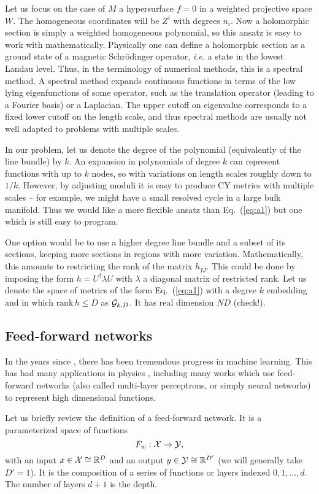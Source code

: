 \documentclass[12pt]{article}
\def\IR{\mathbb{R}}
\def\CX {{\cal X}}
\def\CG {{\cal G}}
\def\CY{{\cal Y}}
\newcommand{\eq}[1]{Eq.~(\ref{eq:#1})}
\newcommand{\be}{\begin{equation}}
\newcommand{\ee}{\end{equation}}
\def\bJ{{\bar{J}}}
\begin{document}
Let us focus on the case of $M$ a hypersurface $f=0$ in a weighted projective space $W$.
The homogeneous coordinates will be $Z^i$ with degrees $n_i$.
Now a holomorphic section is simply
a weighted homogeneous polynomial, so this ansatz is easy to work with mathematically.
Physically one can define a holomorphic section as a 
ground state of a magnetic Schr\"odinger operator, {\it i.e.} a state in the lowest Landau level.
Thus, in the terminology of numerical methods, this is a spectral method.  A spectral method expands
continuous functions in terms of the low lying eigenfunctions of some operator, such as the
translation operator (leading to a Fourier basis) or a Laplacian.  The upper cutoff on eigenvalue
corresponds to a fixed lower cutoff on the length scale, and thus 
spectral methods are usually not well adapted to problems with multiple scales.

In our problem, 
let us denote the degree of the polynomial (equivalently of the line bundle) by $k$.  An expansion
in polynomials of degree $k$ can represent functions with up to $k$ nodes, so with variations on
length scales roughly down to $1/k$.  However,
by adjusting moduli it is easy to produce CY metrics with multiple scales -- for example,
we might have a small resolved cycle in a large bulk manifold.  Thus we would like a more flexible
ansatz than \eq{a1} but one which is still easy to program.  

One option would be to use a higher
degree line bundle and a subset of its sections, keeping more sections in regions with more variation.
Mathematically, this amounts to restricting the rank of the matrix $h_{I\bJ}$.
This could be done by imposing the form $h=U^\dag \lambda U$ with $\lambda$ a
diagonal matrix of restricted rank.
Let us denote the space of metrics of the form \eq{a1} 
with a degree $k$ embedding and in which $\mbox{rank}\, h \le D$ as $\CG_{k,D}$.
It has real dimension $ND$ (check!).

\subsection{ Feed-forward networks }

In the years since \cite{metrics}, there has been tremendous progress in machine learning.
This has had many applications in physics \cite{review}, including many works which 
use feed-forward networks (also called multi-layer perceptrons, or simply neural networks)
 to represent high dimensional functions.  

Let us briefly review the definition of a feed-forward network.  It is
a parameterized space of functions
\be \label{eq:defF}
F_w : \CX \rightarrow \CY ,
\ee
with an input $x\in\CX \cong \IR^D$ and an output $y\in \CY\cong \IR^{D'}$ (we will generally take $D'=1$).
It is the composition of a series of functions or layers indexed $0,1,\ldots,d$.  The number
of layers $d+1$ is the depth.
\end{document}
